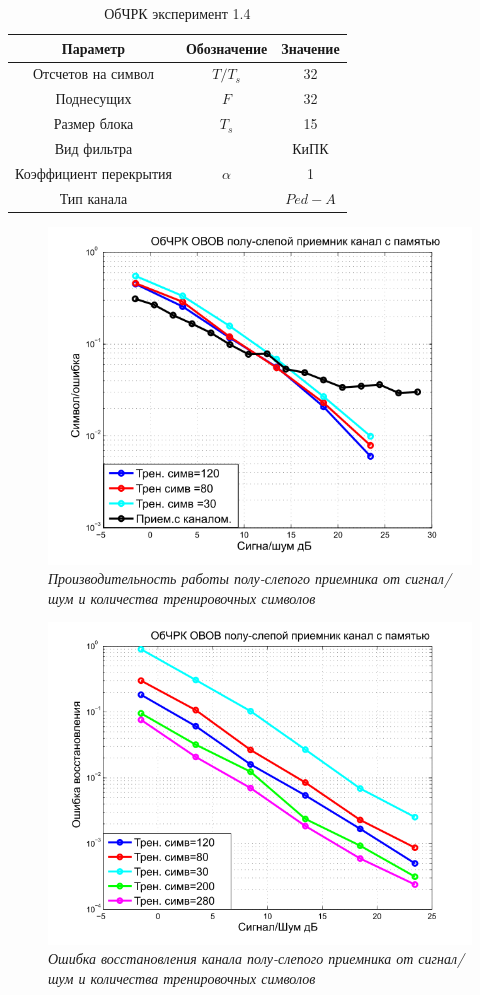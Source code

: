 \begin{table}[H]
\caption{\label{tab:sim_alpha}ОбЧРК эксперимент 1.4}
\begin{center}
\begin{tabular}{|c|c|c|}
\hline
Параметр & Обозначение & Значение \\
\hline
\hline
Отсчетов на символ & $T/T_s$ & 32 \\
\hline
Поднесущих&$F$&32 \\
\hline
Размер блока& $T_s$  &15 \\
\hline
Вид фильтра&  &КиПК \\
\hline
Коэффициент перекрытия&$\alpha$  &1 \\
\hline
Тип канала&& $Ped-A$ \\
\hline
\end{tabular}
\end{center}
\end{table}
\begin{figure}[H]
\centering
\includegraphics[width=0.9\columnwidth]{SM_SISO_FS_SER.png}
\caption{\textit{Производительность работы полу-слепого приемника от сигнал/шум и количества тренировочных символов}}
\label{fs_8}
\end{figure}
\begin{figure}[H]
\centering
\includegraphics[width=0.9\columnwidth]{SM_SISO_FS_RE.png}
\caption{\textit{Ошибка восстановления канала полу-слепого приемника от сигнал/шум и количества тренировочных символов}}
\label{fs_9}
\end{figure}
